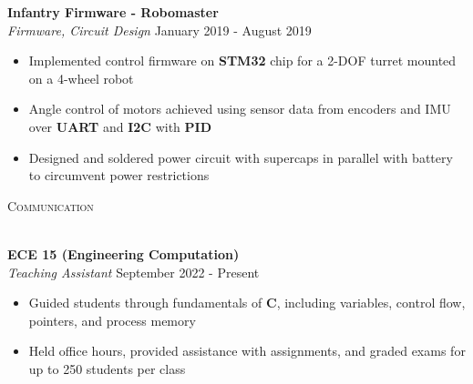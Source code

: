 \documentclass[a4paper]{article}
\newcommand{\lineunder} {
    \vspace*{-8pt} \\
    \hspace*{-18pt} \hrulefill \\
}
\newcommand{\header} [1] {
    {\hspace*{-18pt}\vspace*{6pt} \textsc{#1}}
    \vspace*{-6pt} \lineunder
}
\newenvironment{entry}[4][]{
  \textbf{#2} \hfill #1 \\
  \textit{#3} \hfill #4 \\
  \vspace{-2mm}
  \begin{itemize} \itemsep 0em
  }
  {
  \end{itemize}
}
\begin{document}
\begin{entry}{Infantry Firmware - Robomaster}{Firmware, Circuit Design}{January 2019 - August 2019}
\item Implemented control firmware on \textbf{STM32} chip for a 2-DOF turret mounted on a 4-wheel robot
\item Angle control of motors achieved using sensor data from encoders and IMU
  over \textbf{UART} and \textbf{I2C} with \textbf{PID}
\item Designed and soldered power circuit with supercaps in parallel with
  battery to circumvent power restrictions
\end{entry}
\begin{comment}
\begin{entry}{Pinball Machine}{Rapid Prototyping, Computer Aided Design, Circuit
    Design}{April 2022 - June 2022}
\item Designed and built pinball machine, including subsystems for flipper and bumper mechanism
\item Modeled all components in \textbf{Solidworks}, manufactured primarily with \textbf{3D printing} and \textbf{laser cutting}
\item Designed circuitry to control flippers on button press, and bumpers that
  trigger (via piezoelectric) when hit
\item Wrote software to run on an Arduino to control all actuators and keep
  track of game state
\end{entry}

\begin{entry}{ACM Meme Gen}{Full Stack Web Development}{June 2019 - December 2019}
\item Created a meme generator as a supplement for students to learn MongoDB, Express, React, and Node.js
\item Implemented \textbf{React} components and state management, called the
  Imgflip API for templates
\item \textbf{MongoDB} back-end used to store user-created memes for a central gallery
\end{entry}
\end{comment}




\header{Communication}
\vspace{1mm}

\begin{entry}{ECE 15 (Engineering Computation)}{Teaching Assistant}{September 2022 - Present}
  \item Guided students through fundamentals of \textbf{C},
    including variables, control flow, pointers, and process memory 
  \item Held office hours, provided assistance with assignments, and graded exams for up to 250 students per class
\end{entry}
\end{document}
